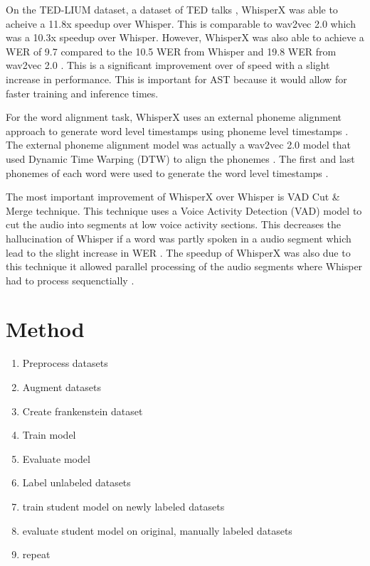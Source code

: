 \documentclass[letterpaper, 12pt]{article}
\begin{document}
\begin{multicols*}{2}
On the TED-LIUM dataset, a dataset of TED talks \cite{tedlium3}, WhisperX was able to acheive a
11.8x speedup over Whisper. This is comparable to wav2vec 2.0 which was a 10.3x speedup over
Whisper. However, WhisperX was also able to achieve a WER of 9.7 compared to the 10.5 WER from
Whisper and 19.8 WER from wav2vec 2.0 \citep{whisperX}. This is a significant improvement over
of speed with a slight increase in performance. This is important for AST because it would allow
for faster training and inference times.

For the word alignment task, WhisperX uses an external phoneme alignment approach to generate
word level timestamps using phoneme level timestamps \citep{whisperX}. The external phoneme
alignment model was actually a wav2vec 2.0 model that used Dynamic Time Warping (DTW) to align
the phonemes \citep{whisperX}. The first and last phonemes of each word were used to generate
the word level timestamps \citep{whisperX}.

The most important improvement of WhisperX over Whisper is VAD Cut \& Merge technique. This
technique uses a Voice Activity Detection (VAD) model to cut the audio into segments at low voice
activity sections. This decreases the hallucination of Whisper if a word was partly spoken in a
audio segment which lead to the slight increase in WER \citep{whisperX}. The speedup of WhisperX
was also due to this technique it allowed parallel processing of the audio segments where
Whisper had to process sequenctially \citep{whisperX}.


\section{Method}
\begin{enumerate}
    \item Preprocess datasets
    \item Augment datasets
    \item Create frankenstein dataset
    \item Train model
    \item Evaluate model
    \item Label unlabeled datasets
    \item train student model on newly labeled datasets
    \item evaluate student model on original, manually labeled datasets
    \item repeat
\end{enumerate}


\end{multicols*}
\end{document}
